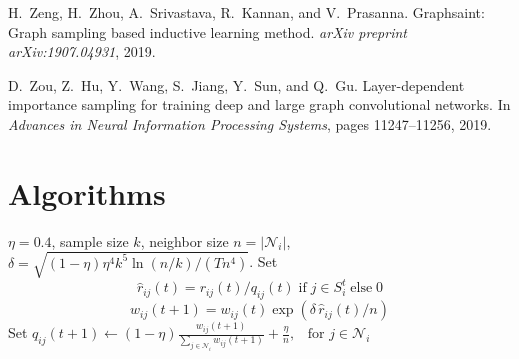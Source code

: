 \documentclass{article}
\begin{document}
\begin{thebibliography}{25}
H.~Zeng, H.~Zhou, A.~Srivastava, R.~Kannan, and V.~Prasanna.
\newblock Graphsaint: Graph sampling based inductive learning method.
\newblock \emph{arXiv preprint arXiv:1907.04931}, 2019.

D.~Zou, Z.~Hu, Y.~Wang, S.~Jiang, Y.~Sun, and Q.~Gu.
\newblock Layer-dependent importance sampling for training deep and large graph
  convolutional networks.
\newblock In \emph{Advances in Neural Information Processing Systems}, pages
  11247--11256, 2019.

\end{thebibliography}

\clearpage
\appendix


\section{Algorithms}\label{appendix:alg}
\begin{algorithm}
\caption{$\mathrm{EXP3}(q_i^t,w_i^t,r_i^t,S_i^t)$.}
\label{alg:exp3}
\begin{algorithmic}[1]
\Require $\eta=0.4$, sample size $k$, neighbor size $n = |\mathcal{N}_i|$, $\delta=\sqrt{(1-\eta)\eta^4k^5\ln(n/k)/(Tn^4)}$.
\State Set 
	$$
	\hat{r}_{ij}(t)=
		r_{ij}(t)/q_{ij}(t)\; \text{if}\; j\in S_i^t \;\text{else}\;0
	$$
	$$
	w_{ij}(t+1)= w_{ij}(t)\exp(\delta\,\hat{r}_{ij}(t)/n) 
	$$
\State Set
$
q_{ij}(t+1) \gets (1-\eta) \frac{w_{ij}(t+1)}{\sum_{j\in \mathcal{N}_i} w_{ij}(t+1)} + 
\frac{\eta}{n}, \,\,\,\,\,\text{for}\,\, j \in \mathcal{N}_i
$
\end{algorithmic}
\end{algorithm}
\end{document}
